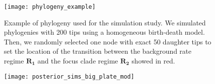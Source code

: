 \begin{figure}[h]
	\centering
	\texttt{[image: phylogeny\_example]}
	\caption[Example of phylogeny used for the simulation study.]{Example of phylogeny used for the simulation study. We simulated phylogenies with 200 tips using a homogeneous birth-death model. Then, we randomly selected one node with exact 50 daughter tips to set the location of the transition between the background rate regime $\mathbf{R_{1}}$ and the focus clade regime $\mathbf{R_{2}}$ showed in red.}
	\label{fig:phylogeny_sims}
\end{figure}

\begin{figure}[h]
	\centering
	\texttt{[image: posterior\_sims\_big\_plate\_mod]}
\end{figure}
\clearpage %
